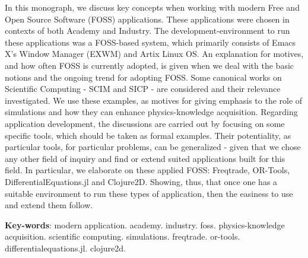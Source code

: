 \documentclass[
12pt,				%
openright,			%
oneside,			%
a4paper,			%
brazil,				%
english,			%
]{abntex2}
\begin{document}
\setlength{\absparsep}{18pt} %
\begin{resumo}
In this monograph, we discuss key concepts when working
with modern Free and Open Source Software (FOSS) applications. These
applications were chosen in contexts of both Academy and Industry. The
development-environment to run these applications was a FOSS-based
system, which primarily consists of Emacs X's Window Manager (EXWM)
and Artix Linux OS.
An explanation for motives, and how often FOSS is currently adopted, is
given when we deal with the basic notions and the ongoing trend for
adopting FOSS.
Some canonical works on Scientific Computing - SCIM and SICP - are
considered and their relevance investigated. We use these examples, as
motives for giving emphasis to the role of simulations and how they
can enhance physics-knowledge acquisition.
Regarding application development, the discussions are carried out by
focusing on some specific tools, which should be taken as formal
examples. Their potentiality, as particular tools, for particular
problems, can be generalized - given that we chose any other field of
inquiry and find or extend suited applications built for this field.
In particular, we elaborate on these applied FOSS: Freqtrade, OR-Tools,
DifferentialEquations.jl and Clojure2D. Showing, thus, that once one has a
suitable environment to run these types of application, then the easiness to use
and extend them follow.

\textbf{Key-words}: modern application. academy. industry. foss. physics-knowledge
acquisition. scientific computing. simulations. freqtrade. or-tools. differentialequations.jl. clojure2d.
\end{resumo}
\end{document}
